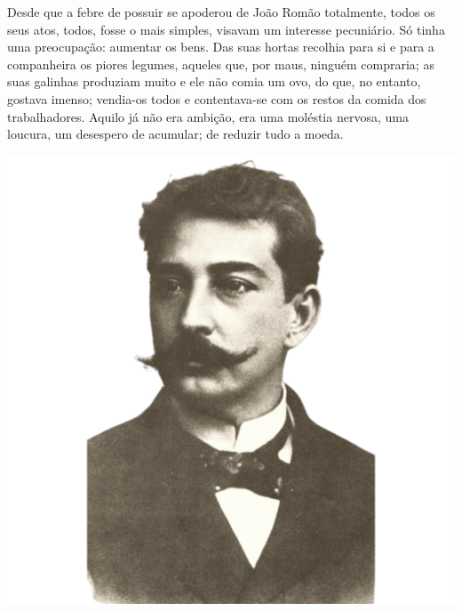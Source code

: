 \begin{myquote}
\begin{minipage}{0.5\textwidth}
Desde que a febre de possuir se apoderou de João Romão totalmente, todos os seus atos, todos, 
fosse o mais simples, visavam um interesse pecuniário. Só tinha uma preocupação: aumentar 
os bens. Das suas hortas recolhia para si e para a companheira os piores legumes, aqueles que,
por maus, ninguém compraria; as suas galinhas produziam muito e ele não comia um ovo, do que, 
no entanto, gostava imenso; vendia-os todos e contentava-se com os restos da comida dos 
trabalhadores. Aquilo já não era ambição, era uma moléstia nervosa, uma loucura, um desespero
de acumular; de reduzir tudo a moeda.
\end{minipage}
\hfill
\begin{minipage}{0.5\textwidth}
  \centering
  \includegraphics[width=\textwidth]{./imgSAEB_7_POR/media/image53.png}
\end{minipage}


\end{myquote}


